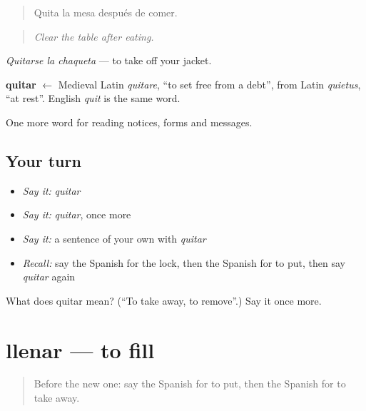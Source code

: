\begin{quote}
Quita la mesa después de comer.
\end{quote}

\begin{quote}
\emph{Clear the table after eating.}
\end{quote}

\emph{Quitarse la chaqueta} — to take off your jacket.

\begin{cousinweb}
\textbf{quitar} $\leftarrow$ Medieval Latin \emph{quitare}, \textquotedblleft{}to set free from a debt\textquotedblright{}, from Latin \emph{quietus}, \textquotedblleft{}at rest\textquotedblright{}. English \emph{quit} is the same word.
\end{cousinweb}

\begin{grammarlens}[title={What you've built}]
One more word for reading notices, forms and messages.
\end{grammarlens}

\subsection*{Your turn}
\begin{itemize}
\raggedright
  \item \emph{Say it:} \emph{quitar}
  \item \emph{Say it:} \emph{quitar}, once more
  \item \emph{Say it:} a sentence of your own with \emph{quitar}
  \item \emph{Recall:} say the Spanish for the lock, then the Spanish for to put, then say \emph{quitar} again
\end{itemize}

\begin{tcolorbox}[breakable,colback=teal!4,colframe=teal!35!black,title={Before you move on}]
What does quitar mean? (\textquotedblleft{}To take away, to remove\textquotedblright{}.) Say it once more.
\end{tcolorbox}
\section[llenar]{llenar — to fill}

\label{lesson:ES-C496-llenar}



\begin{quote}
Before the new one: say the Spanish for to put, then the Spanish for to take away.
\end{quote}

